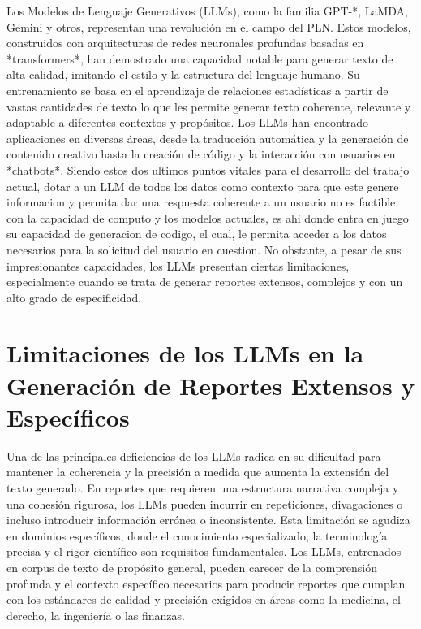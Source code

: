 Los Modelos de Lenguaje Generativos (LLMs), como la familia GPT-*, LaMDA, Gemini y otros, representan una revolución en el campo del PLN.  Estos modelos, construidos con arquitecturas de redes neuronales profundas basadas en *transformers*, han demostrado una capacidad notable para generar texto de alta calidad, imitando el estilo y la estructura del lenguaje humano. Su entrenamiento se basa en el aprendizaje de relaciones estadísticas a partir de vastas cantidades de texto lo que les permite generar texto coherente, relevante y adaptable a diferentes contextos y propósitos. Los LLMs han encontrado aplicaciones en diversas áreas, desde la traducción automática y la generación de contenido creativo hasta la creación de código y la interacción con usuarios en *chatbots*. Siendo estos dos ultimos puntos vitales para el desarrollo del trabajo actual, dotar a un LLM de todos los datos como contexto para que este genere informacion y permita dar una respuesta coherente a un usuario no es factible con la capacidad de computo y los modelos actuales, es ahi donde entra en juego su capacidad de generacion de codigo, el cual, le permita acceder a los datos necesarios para la solicitud del usuario en cuestion. No obstante, a pesar de sus impresionantes capacidades, los LLMs presentan ciertas limitaciones, especialmente cuando se trata de generar reportes extensos, complejos y con un alto grado de especificidad.

\section*{Limitaciones de los LLMs en la Generación de Reportes Extensos y Específicos}

Una de las principales deficiencias de los LLMs radica en su dificultad para mantener la coherencia y la precisión a medida que aumenta la extensión del texto generado. En reportes que requieren una estructura narrativa compleja y una cohesión rigurosa, los LLMs pueden incurrir en repeticiones, divagaciones o incluso introducir información errónea o inconsistente. Esta limitación se agudiza en dominios específicos, donde el conocimiento especializado, la terminología precisa y el rigor científico son requisitos fundamentales. Los LLMs, entrenados en corpus de texto de propósito general, pueden carecer de la comprensión profunda y el contexto específico necesarios para producir reportes que cumplan con los estándares de calidad y precisión exigidos en áreas como la medicina, el derecho, la ingeniería o las finanzas.

